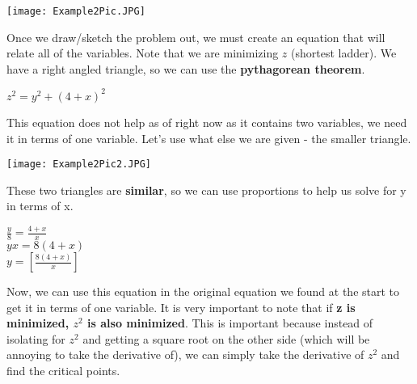 \documentclass[12pt,fleqn]{book} %
\begin{document}
\vspace*{5mm}



\begin{center}
    \texttt{[image: Example2Pic.JPG]}
\end{center}

\noindent Once we draw/sketch the problem out, we must create an equation that will relate all of the variables. Note that we are minimizing $z$ (shortest ladder).
We have a right angled triangle, so we can use the \textbf{pythagorean theorem}.

\begin{center}
    $z^2=y^2+(4+x)^2$
\end{center}

\noindent This equation does not help as of right now as it contains two variables, we need it in terms of one variable. Let's use what else we are given - the smaller triangle. \\

\begin{center}
    \texttt{[image: Example2Pic2.JPG]}
\end{center}

\noindent These two triangles are \textbf{similar}, so we can use proportions to help us solve for y in terms of x.

\begin{center}
    \large{$\frac{y}{8}=\frac{4+x}{x}$ \\
    $yx = 8(4+x)$ \\
    $y=[\frac{8(4+x)}{x}]$}
\end{center}

\noindent Now, we can use this equation in the original equation we found at the start to get it in terms of one variable. It is very important to note
that if \textbf{z is minimized, $z^2$ is also minimized}. This is important because instead of isolating for $z^2$ and getting a square root on the other
side (which will be annoying to take the derivative of), we can simply take the derivative of $z^2$ and find the critical points.
\end{document}
